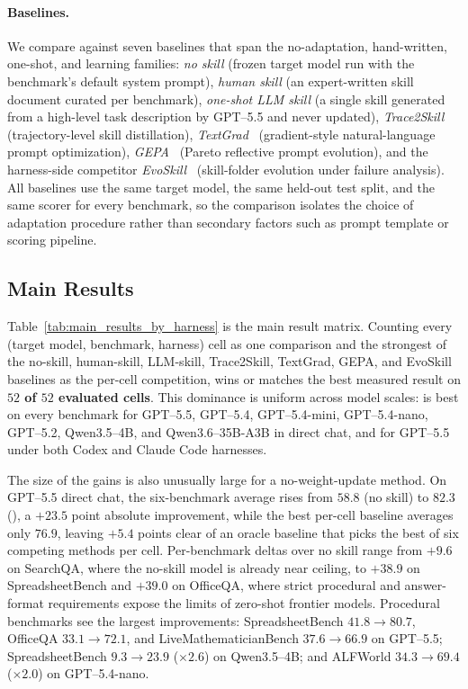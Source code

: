 \paragraph{Baselines.}
We compare against seven baselines that span the no-adaptation, hand-written, one-shot, and learning families: \emph{no skill} (frozen target model run with the benchmark's default system prompt), \emph{human skill} (an expert-written skill document curated per benchmark), \emph{one-shot LLM skill} (a single skill generated from a high-level task description by GPT--5.5 and never updated), \emph{Trace2Skill}~\citep{ni2026trace2skill} (trajectory-level skill distillation), \emph{TextGrad}~\citep{yuksekgonul2024textgrad} (gradient-style natural-language prompt optimization), \emph{GEPA}~\citep{agrawal2025gepa} (Pareto reflective prompt evolution), and the harness-side competitor \emph{EvoSkill}~\citep{alzubi2026evoskill} (skill-folder evolution under failure analysis). All baselines use the same target model, the same held-out test split, and the same scorer for every benchmark, so the comparison isolates the choice of adaptation procedure rather than secondary factors such as prompt template or scoring pipeline.

\subsection{Main Results}
\label{sec:main_results}

Table~\ref{tab:main_results_by_harness} is the main result matrix. Counting every (target model, benchmark, harness) cell as one comparison and the strongest of the no-skill, human-skill, LLM-skill, Trace2Skill, TextGrad, GEPA, and EvoSkill baselines as the per-cell competition, \ourmethod{} wins or matches the best measured result on \textbf{$52$ of $52$ evaluated cells}. This dominance is uniform across model scales: \ourmethod{} is best on every benchmark for GPT--5.5, GPT--5.4, GPT--5.4-mini, GPT--5.4-nano, GPT--5.2, Qwen3.5--4B, and Qwen3.6--35B-A3B in direct chat, and for GPT--5.5 under both Codex and Claude Code harnesses.

The size of the gains is also unusually large for a no-weight-update method. On GPT--5.5 direct chat, the six-benchmark average rises from $58.8$ (no skill) to $82.3$ (\ourmethod{}), a $+23.5$ point absolute improvement, while the best per-cell baseline averages only $76.9$, leaving \ourmethod{} $+5.4$ points clear of an oracle baseline that picks the best of six competing methods per cell. Per-benchmark deltas over no skill range from $+9.6$ on SearchQA, where the no-skill model is already near ceiling, to $+38.9$ on SpreadsheetBench and $+39.0$ on OfficeQA, where strict procedural and answer-format requirements expose the limits of zero-shot frontier models. Procedural benchmarks see the largest improvements: SpreadsheetBench $41.8{\to}80.7$, OfficeQA $33.1{\to}72.1$, and LiveMathematicianBench $37.6{\to}66.9$ on GPT--5.5; SpreadsheetBench $9.3{\to}23.9$ ($\times 2.6$) on Qwen3.5--4B; and ALFWorld $34.3{\to}69.4$ ($\times 2.0$) on GPT--5.4-nano.

